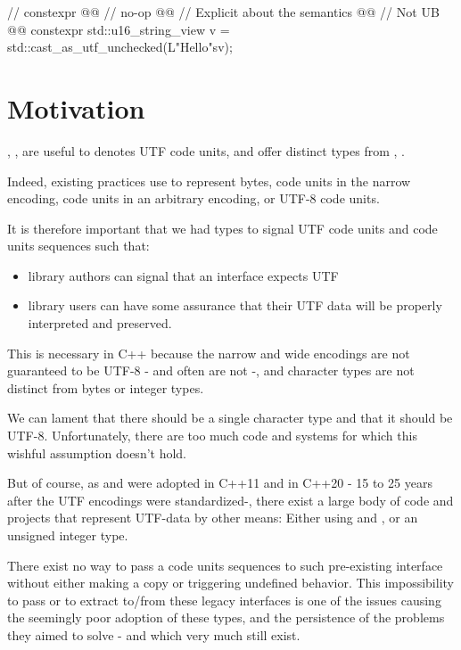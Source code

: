 \documentclass{wg21}
\begin{document}
\begin{colorblock}
// constexpr @@
// no-op @@
// Explicit about the semantics @@
// Not UB @@
constexpr std::u16_string_view v = std::cast_as_utf_unchecked(L"Hello"sv);
\end{colorblock}

\section {Motivation}

, ,  are useful to denotes UTF code units,
and offer distinct types from , .

Indeed, existing practices use  to represent bytes, code units in the narrow encoding,
code units in an arbitrary encoding, or UTF-8 code units.

It is therefore important that we had types to signal UTF code units and code units sequences such that:
\begin{itemize}
    \item library authors can signal that an interface expects UTF
    \item library users can have some assurance that their UTF data will be properly interpreted and preserved.
\end{itemize}

This is necessary in C++ because the narrow and wide encodings are not guaranteed to be UTF-8 - and often are not -,
and character types are not distinct from bytes or integer types.

We can lament that there should be a single character type and that it should be UTF-8.
Unfortunately, there are too much code and systems for which this wishful assumption doesn't hold.

But of course, as  and  were adopted in C++11 and  in C++20 - 15 to 25 years after the UTF encodings were standardized-, there exist a large body of code and projects that represent UTF-data by other means: Either using  and , or an unsigned integer type.

There exist no way to pass a  code units sequences to such pre-existing interface without either making a copy
or triggering undefined behavior.
This impossibility to pass or to extract  to/from these legacy interfaces is one of the issues causing the seemingly poor adoption of these types, and the persistence of the problems they aimed to solve - and which very much still exist.
\end{document}
